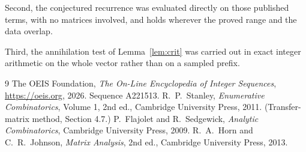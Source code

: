 \documentclass[11pt,a4paper]{article}
\theoremstyle{plain}
\theoremstyle{definition}
\begin{document}
Second, the conjectured recurrence was evaluated directly on those published terms, with no
matrices involved, and holds wherever the proved range and the data overlap.

Third, the annihilation test of Lemma~\ref{lem:crit} was carried out in exact integer
arithmetic on the whole vector rather than on a sampled prefix.

\begin{thebibliography}{9}
 The OEIS Foundation, \emph{The On-Line Encyclopedia of Integer
Sequences}, \url{https://oeis.org}, 2026. Sequence A221513.
 R.~P.~Stanley, \emph{Enumerative Combinatorics}, Volume 1, 2nd ed.,
Cambridge University Press, 2011. (Transfer-matrix method, Section 4.7.)
 P.~Flajolet and R.~Sedgewick, \emph{Analytic Combinatorics}, Cambridge
University Press, 2009.
 R.~A.~Horn and C.~R.~Johnson, \emph{Matrix Analysis}, 2nd ed., Cambridge
University Press, 2013.
\end{thebibliography}
\end{document}
